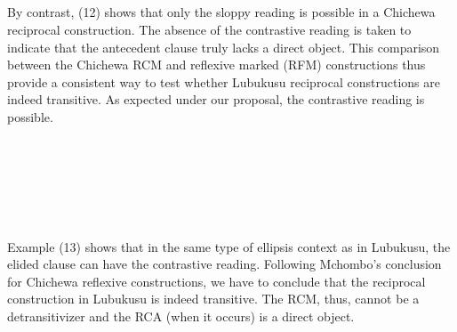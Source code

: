 \documentclass[output=paper]{langsci/langscibook}
\begin{document}
\begin{listWWviiiNumxlileveli}
\item \ea\label{ex:}
\\
\ea\label{ex:}
\\
\ea\label{ex:}
\\
\ea\label{ex:}
\\
\end{listWWviiiNumxlileveli}

By contrast, (12) shows that only the sloppy reading is possible in a Chichewa reciprocal construction. The absence of the contrastive reading is taken to indicate that the antecedent clause truly lacks a direct object. This comparison between the Chichewa RCM and reflexive marked (RFM) constructions thus provide a consistent way to test whether Lubukusu reciprocal constructions are indeed transitive. As expected under our proposal, the contrastive reading is possible.

\begin{listWWviiiNumxlileveli}
\item \ea\label{ex:}
\\
\ea\label{ex:}
\\
\ea\label{ex:}
\\
\ea\label{ex:}
\\
\ea\label{ex:}
\\
\end{listWWviiiNumxlileveli}

Example (13) shows that in the same type of ellipsis context as in Lubukusu, the elided clause can have the contrastive reading. Following Mchombo's conclusion for Chichewa reflexive constructions, we have to conclude that the reciprocal construction in Lubukusu is indeed transitive. The RCM, thus, cannot be a detransitivizer and the RCA (when it occurs) is a direct object.
\end{document}
